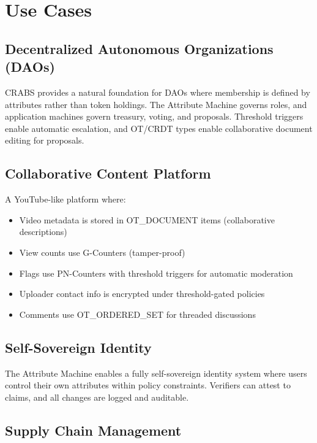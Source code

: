 \documentclass[11pt,a4paper]{article}
\begin{document}
\section{Use Cases}

\subsection{Decentralized Autonomous Organizations (DAOs)}

CRABS provides a natural foundation for DAOs where membership is defined by attributes rather than token holdings. The Attribute Machine governs roles, and application machines govern treasury, voting, and proposals. Threshold triggers enable automatic escalation, and OT/CRDT types enable collaborative document editing for proposals.

\subsection{Collaborative Content Platform}

A YouTube-like platform where:

\begin{itemize}[leftmargin=*]
    \item Video metadata is stored in OT\_DOCUMENT items (collaborative descriptions)
    \item View counts use G-Counters (tamper-proof)
    \item Flags use PN-Counters with threshold triggers for automatic moderation
    \item Uploader contact info is encrypted under threshold-gated policies
    \item Comments use OT\_ORDERED\_SET for threaded discussions
\end{itemize}

\subsection{Self-Sovereign Identity}

The Attribute Machine enables a fully self-sovereign identity system where users control their own attributes within policy constraints. Verifiers can attest to claims, and all changes are logged and auditable.

\subsection{Supply Chain Management}
\end{document}
